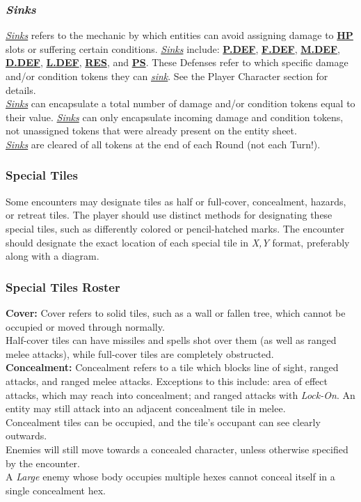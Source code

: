 \documentclass[12pt]{article}
\newcommand{\refto}[1]{\hyperlink{#1}{\textbf{#1}}}
\newcommand{\reftoit}[1]{\hyperlink{#1}{\emph{#1}}}
\begin{document}
\begin{multicols*}{2}
\subsubsection{\emph{Sinks}}
\hypertarget{sink}{}\hypertarget{sunk}{}\hypertarget{sinks}{}\hypertarget{Sinks}{}
\reftoit{Sinks} refers to the mechanic by which entities can avoid assigning damage to \refto{HP} slots or suffering certain conditions. \reftoit{Sinks} include: \refto{P.DEF}, \refto{F.DEF}, \refto{M.DEF}, \refto{D.DEF}, \refto{L.DEF}, \refto{RES}, and \refto{PS}. These Defenses refer to which specific damage and/or condition tokens they can \reftoit{sink}. See the Player Character section for details.\\
\reftoit{Sinks} can encapsulate a total number of damage and/or condition tokens equal to their value. \reftoit{Sinks} can only encapsulate incoming damage and condition tokens, not unassigned tokens that were already present on the entity sheet.\\
\reftoit{Sinks} are cleared of all tokens at the end of each Round (not each Turn!).

\subsubsection{Special Tiles}
Some encounters may designate tiles as half or full-cover, concealment, hazards, or retreat tiles. The player should use distinct methods for designating these special tiles, such as differently colored or pencil-hatched marks. The encounter should designate the exact location of each special tile in \emph{X,Y} format, preferably along with a diagram.

\subsubsection{Special Tiles Roster}
\textbf{Cover:} Cover refers to solid tiles, such as a wall or fallen tree, which cannot be occupied or moved through normally.\\
Half-cover tiles can have missiles and spells shot over them (as well as ranged melee attacks), while full-cover tiles are completely obstructed.\\

\textbf{Concealment:} Concealment refers to a tile which blocks line of sight, ranged attacks, and ranged melee attacks. Exceptions to this include: area of effect attacks, which may reach into concealment; and ranged attacks with \emph{Lock-On}. An entity may still attack into an adjacent concealment tile in melee.\\
Concealment tiles can be occupied, and the tile’s occupant can see clearly outwards.\\
Enemies will still move towards a concealed character, unless otherwise specified by the encounter.\\
A \emph{Large} enemy whose body occupies multiple hexes cannot conceal itself in a single concealment hex. \\


\end{multicols*}
\end{document}
